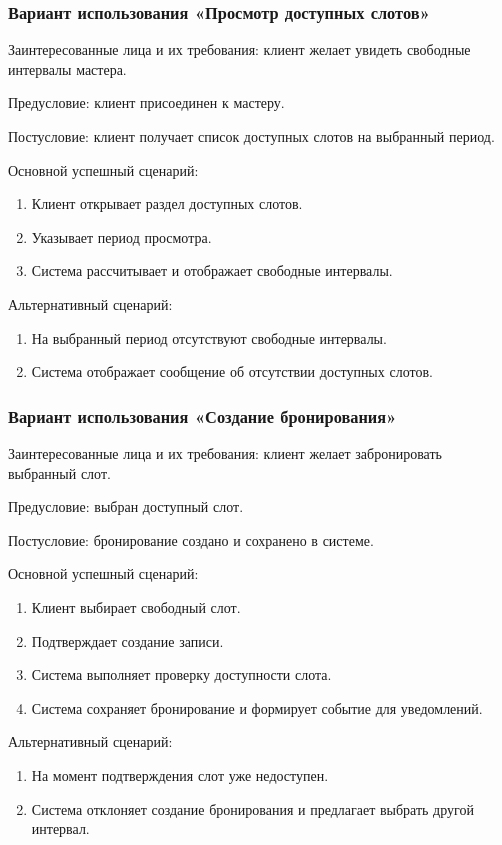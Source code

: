 \subsubsection{Вариант использования «Просмотр доступных слотов»}

Заинтересованные лица и их требования: клиент желает увидеть свободные интервалы мастера.

Предусловие: клиент присоединен к мастеру.

Постусловие: клиент получает список доступных слотов на выбранный период.

Основной успешный сценарий:
\begin{enumerate}
\item Клиент открывает раздел доступных слотов.
\item Указывает период просмотра.
\item Система рассчитывает и отображает свободные интервалы.
\end{enumerate}

Альтернативный сценарий:
\begin{enumerate}
\item На выбранный период отсутствуют свободные интервалы.
\item Система отображает сообщение об отсутствии доступных слотов.
\end{enumerate}

\subsubsection{Вариант использования «Создание бронирования»}

Заинтересованные лица и их требования: клиент желает забронировать выбранный слот.

Предусловие: выбран доступный слот.

Постусловие: бронирование создано и сохранено в системе.

Основной успешный сценарий:
\begin{enumerate}
\item Клиент выбирает свободный слот.
\item Подтверждает создание записи.
\item Система выполняет проверку доступности слота.
\item Система сохраняет бронирование и формирует событие для уведомлений.
\end{enumerate}

Альтернативный сценарий:
\begin{enumerate}
\item На момент подтверждения слот уже недоступен.
\item Система отклоняет создание бронирования и предлагает выбрать другой интервал.
\end{enumerate}

